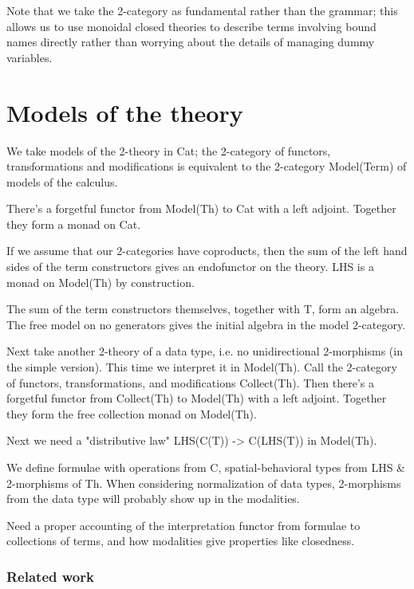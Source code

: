 \documentclass[]{acm_proc_article-sp}
\numberwithin{equation}{subsection}
\newcommand{\pic}{$\pi$-calculus}
\begin{document}
Note that we take the 2-category as fundamental rather than the grammar; this allows us to use monoidal closed theories to describe terms involving bound names directly rather than worrying about the details of managing dummy variables.

\section{Models of the theory}

We take models of the 2-theory in Cat; the 2-category of functors, transformations and
modifications is equivalent to the 2-category Model(Term) of models of
the calculus.

There's a forgetful functor from Model(Th) to Cat with a left adjoint.
Together they form a monad on Cat.


If we assume that our 2-categories have coproducts, then the sum of
the left hand sides of the term constructors gives an endofunctor on
the theory.  LHS is a monad on Model(Th) by construction.


The sum of the term constructors themselves, together with T, form an
algebra.  The free model on no generators gives the initial algebra in
the model 2-category.


Next take another 2-theory of a data type, i.e. no unidirectional
2-morphisms (in the simple version).  This time we interpret it in
Model(Th).  Call the 2-category of functors, transformations, and
modifications Collect(Th).  Then there's a forgetful functor from
Collect(Th) to Model(Th) with a left adjoint.  Together they form the
free collection monad on Model(Th).


Next we need a "distributive law" LHS(C(T)) -> C(LHS(T)) in Model(Th).


We define formulae with operations from C, spatial-behavioral types
from LHS \& 2-morphisms of Th.  When considering normalization of data
types, 2-morphisms from the data type will probably show up in the
modalities.

Need a proper accounting of the interpretation functor from formulae
to collections of terms, and how modalities give properties like
closedness.

\subsubsection{Related work}

\end{document}

